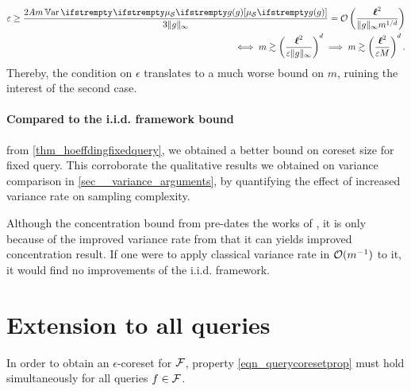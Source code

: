 \begin{align*}
	\epsilon 
	\geq  \frac{2 A m \Var{}{\empdistr{\mathcal{S}}{\twoquery}}}{3\|\twoquery \|_{\infty}}
	= \OO\left(\frac{\lipschitz^2}{\|\twoquery \|_{\infty} m^{1/d}}\right)\\
	\iff
	m \gtrsim \left(\frac{\lipschitz^2}{\epsilon\|\twoquery \|_{\infty}}\right)^d
	\implies
	m \gtrsim \left(\frac{\lipschitz^2}{\epsilon\bound}\right)^d.
\end{align*}
Thereby, the condition on $\epsilon$ translates to a much worse bound on $m$, ruining the interest of the second case.
		 


\paragraph{Compared to the i.i.d. framework bound} from \cref{thm_hoeffdingfixedquery}, we obtained a better bound on coreset size for fixed query. This corroborate the qualitative results we obtained on variance comparison in \cref{sec__variance_arguments}, by quantifying the effect of increased variance rate on sampling complexity. 

Although the concentration bound from \cite{breuer2013nevai} pre-dates the works of \cite{tremblay2018dppcoreset}, it is only because of the improved variance rate from \cite{bardenet2021sgddpp} that it can yields improved concentration result. If one were to apply classical variance rate in $\mathcal{O}(m^{-1})$ to it, it would find no improvements of the i.i.d. framework.



\section{Extension to all queries}
\label{sec_extension_all_queries}
In order to obtain an $\epsilon$-coreset for $\mathcal{F}$, property \cref{eqn_querycoresetprop} must hold simultaneously for all queries $f \in \mathcal{F}$.









